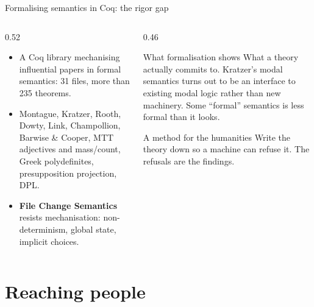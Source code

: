 \documentclass[aspectratio=169, 10pt]{beamer}
\begin{document}
\begin{frame}{Formalising semantics in Coq: the rigor gap}
  \begin{columns}[T]
    \begin{column}{0.52\textwidth}
      \begin{itemize}
        \item A Coq library mechanising influential papers in formal semantics: 31 files, more than 235 theorems.
        \item Montague, Kratzer, Rooth, Dowty, Link, Champollion, Barwise \& Cooper, MTT adjectives and mass/count, Greek polydefinites, presupposition projection, DPL.
        \item \textbf{File Change Semantics} resists mechanisation: non-determinism, global state, implicit choices.
      \end{itemize}
    \end{column}
    \begin{column}{0.46\textwidth}
      \begin{block}{What formalisation shows}
        What a theory actually commits to. Kratzer's modal semantics turns out to be an interface to existing modal logic rather than new machinery. Some ``formal'' semantics is less formal than it looks.
      \end{block}
      \begin{block}{A method for the humanities}
        Write the theory down so a machine can refuse it. The refusals are the findings.
      \end{block}
    \end{column}
  \end{columns}
\end{frame}

\section{Reaching people}
\end{document}
